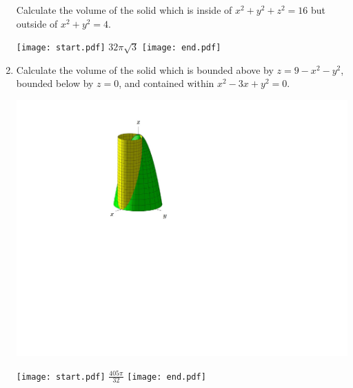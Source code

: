 \documentclass[12pt]{article}
\begin{document}
\begin{enumerate}
Calculate the volume of the solid which is inside of $x^2+y^2+z^2=16$ but outside of $x^2+y^2=4$.

\texttt{[image: start.pdf]}
{{$32\pi\sqrt{3}$}}
\texttt{[image: end.pdf]}


\item Calculate the volume of the solid which is bounded above by $z=9-x^2-y^2$, bounded below by $z=0$, and contained within $x^2-3x+y^2=0$.

\begin{center}
\includegraphics[scale=0.7]{region2.pdf}
\end{center}

\texttt{[image: start.pdf]}
{{$\frac{405\pi}{32}$}}
\texttt{[image: end.pdf]}


\end{enumerate}
\end{document}
